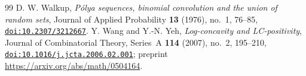 \begin{thebibliography}{99}
 D. W. Walkup, \emph{Pólya sequences, binomial convolution and the union of random sets}, Journal of Applied Probability \textbf{13} (1976), no.~1, 76--85, \href{https://doi.org/10.2307/3212667}{\nolinkurl{doi:10.2307/3212667}}.
 Y. Wang and Y.-N. Yeh, \emph{Log-concavity and LC-positivity}, Journal of Combinatorial Theory, Series~A \textbf{114} (2007), no.~2, 195--210, \href{https://doi.org/10.1016/j.jcta.2006.02.001}{\nolinkurl{doi:10.1016/j.jcta.2006.02.001}}; preprint \url{https://arxiv.org/abs/math/0504164}.
\end{thebibliography}

